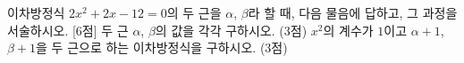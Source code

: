 이차방정식 $2x^2+2x-12=0$의 두 근을 $\alpha$, $\beta$라 할 때, 다음 물음에 답하고, 그 과정을 서술하시오. \cond{$\alpha>\beta$} \mbox{[6점]}
 두 근 $\alpha$, $\beta$의 값을 각각 구하시오. (3점)
 $x^2$의 계수가 $1$이고 $\alpha+1$, $\beta+1$을 두 근으로 하는 이차방정식을 구하시오. (3점)
